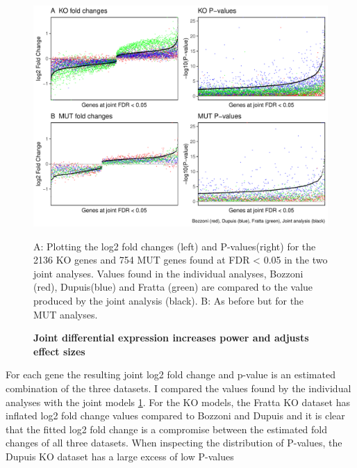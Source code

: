 \begin{figure}[h!]
	\centering
	\includegraphics[width=\textwidth]{Figures/06_fus_meta/fitted_vs_individual_p_lfc.pdf}
	\caption{\textbf{Joint differential expression increases power and adjusts effect sizes}}
	A: Plotting the log2 fold changes (left) and P-values(right) for the 2136 KO genes and 754 MUT genes found at FDR < 0.05 in the two joint analyses. Values found in the individual analyses, Bozzoni (red), Dupuis(blue) and Fratta (green) are compared to the value produced by the joint analysis (black).
	B: As before but for the MUT analyses.
	\label{fig:value_comparison}
\end{figure}

For each gene the resulting joint log2 fold change and p-value is an estimated combination of the three datasets.
I compared the values found by the individual analyses with the joint models \ref{fig:value_comparison}.
For the KO models, the Fratta KO dataset has inflated log2 fold change values compared to Bozzoni and Dupuis and it is clear that the fitted log2 fold change is a compromise between the estimated fold changes of all three datasets. When inspecting the distribution of P-values, the Dupuis KO dataset has a large excess of low P-values




